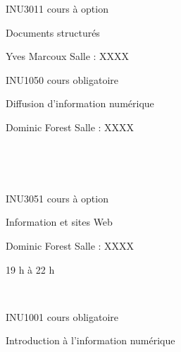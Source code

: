 \documentclass [12 pt]{article}
\begin{document}
                            
                                
                                    INU3011 cours à option
                                
                                
                                    Documents structurés
                                
                                Yves Marcoux
                                Salle : XXXX
                            
                            
                                
                                    INU1050 cours obligatoire
                                
                                
                                    Diffusion d'information numérique
                                
                                Dominic Forest
                                Salle : XXXX
                            
                            
                                 
                            
                            
                                 
                            
                            
                                
                                    INU3051 cours à option
                                
                                
                                    Information et sites Web
                                
                                Dominic Forest
                                Salle : XXXX
                            
                        
                        
                            
                                19 h à 22 h
                            
                             
                             
                            
                                
                                    INU1001 cours obligatoire
                                
                                
                                    Introduction à l'information numérique
                                
\end{document}
